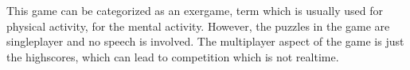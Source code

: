 \documentclass[12pt]{article}
\begin{document}
This game can be categorized as an exergame, term which is usually used for physical activity, for the mental activity. However, the puzzles in the game are singleplayer and no speech is involved. The multiplayer aspect of the game is just the highscores, which can lead to competition which is not realtime. 

\vfill
{}

\clearpage
\end{document}
